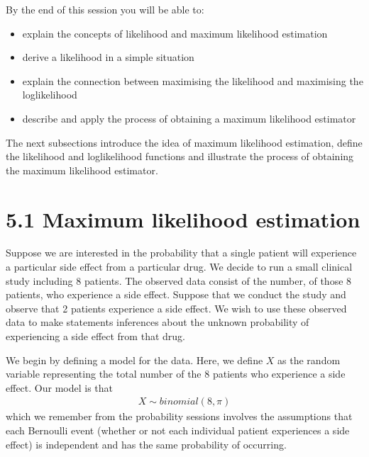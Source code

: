 \documentclass[letterpaper,10pt,english]{jupyterBook}
\begin{document}
\sphinxAtStartPar
By the end of this session you will be able to:
\begin{itemize}
\item {} 
\sphinxAtStartPar
explain the concepts of likelihood and maximum likelihood estimation

\item {} 
\sphinxAtStartPar
derive a likelihood in a simple situation

\item {} 
\sphinxAtStartPar
explain the connection between maximising the likelihood and maximising the log\sphinxhyphen{}likelihood

\item {} 
\sphinxAtStartPar
describe and apply the process of obtaining a maximum likelihood estimator

\end{itemize}



\sphinxAtStartPar
The next sub\sphinxhyphen{}sections introduce the idea of maximum likelihood estimation, define the likelihood and log\sphinxhyphen{}likelihood functions and illustrate the process of obtaining the maximum likelihood estimator.


\section{5.1 Maximum likelihood estimation}
\label{\detokenize{05.b. Likelihood:maximum-likelihood-estimation}}\label{\detokenize{05.b. Likelihood::doc}}
\sphinxAtStartPar
Suppose we are interested in the probability that a single patient will experience a particular side effect from a particular drug. We decide to run a small clinical study including 8 patients. The observed data consist of the number, of those 8 patients, who experience a side effect. Suppose that we conduct the study and observe that 2 patients experience a side effect. We wish to use these observed data to make statements \sphinxhyphen{} inferences \sphinxhyphen{} about the unknown probability of experiencing a side effect from that drug.

\sphinxAtStartPar
{} We begin by defining a model for the data. Here, we define \(X\) as the random variable representing the total number of the 8 patients who experience a side effect. Our model is that
\begin{equation*}
\begin{split}
X \sim binomial(8, \pi)
\end{split}
\end{equation*}
\sphinxAtStartPar
which \sphinxhyphen{} we remember from the probability sessions \sphinxhyphen{} involves the assumptions that each Bernoulli event (whether or not each individual patient experiences a side effect) is independent and has the same probability of occurring.
\end{document}
